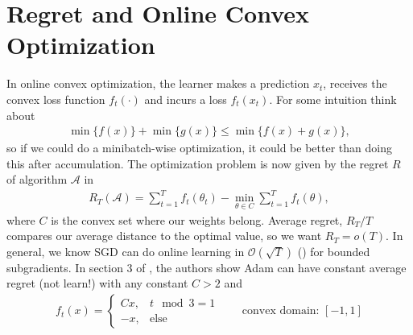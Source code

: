 \documentclass[landscape,twocolumn]{article}
\newcommand{\calA}{\mathcal{A}}
\newcommand{\bigO}{\mathcal{O}}
\newcommand{\1}{\mathds{1}}
\begin{document}
\section*{Regret and Online Convex Optimization}
In online convex optimization, the learner makes a prediction \(x_t\), receives the convex loss function \(f_t(\cdot)\) and incurs a loss \(f_t(x_t)\). For some intuition think about 
\begin{align*}
\min\{f(x)\}+\min\{g(x)\}\leq \min\{f(x)+g(x)\},
\end{align*}
so if we could do a minibatch-wise optimization, it could be better than doing this after accumulation. The optimization problem is now given by the regret \(R\) of algorithm \(\calA\) in 
\begin{align*}
R_T(\calA) = \sum_{t=1}^T f_t(\theta_t) - \min_{\theta\in C} \sum_{t=1}^T f_t(\theta),
\end{align*}
where \(C\) is the convex set where our weights belong. Average regret, \(R_T/T\) compares our average distance to the optimal value, so we want \(R_T = o(T)\). In general, we know SGD can do online learning in \(\bigO(\sqrt{T})\) (\cite{langford2009slow}) for bounded subgradients. In section 3 of \cite{reddi2019convergence}, the authors show Adam can have constant average regret (not learn!) with any constant \(C>2\) and 
\begin{align*}
f_t(x) = \begin{cases}
    Cx, & t\mod 3 = 1\\ 
    -x, & \text{else}
\end{cases}\qquad \text{convex domain: }[-1,1]
\end{align*}
\end{document}
